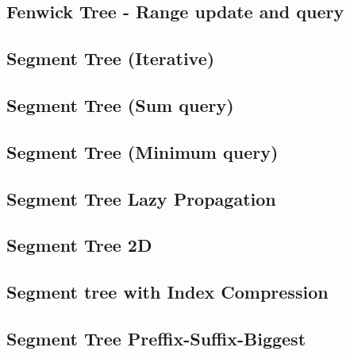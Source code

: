 \documentclass[10pt]{article}
\begin{document}
\begin{multicols*}{2}
\subsection{Fenwick Tree - Range update and query}


\subsection{Segment Tree (Iterative)}


\subsection{Segment Tree (Sum query)}


\subsection{Segment Tree (Minimum query)}


\subsection{Segment Tree Lazy Propagation}


\subsection{Segment Tree 2D}


\subsection{Segment tree with Index Compression}


\subsection{Segment Tree Preffix-Suffix-Biggest}



\end{multicols*}
\end{document}
